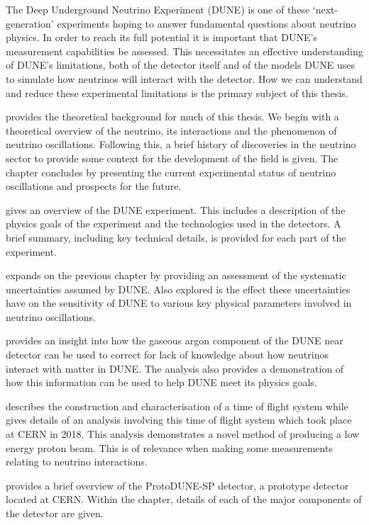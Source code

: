 The Deep Underground Neutrino Experiment (DUNE) is one of these `next-generation' experiments hoping to answer fundamental questions about neutrino physics.
In order to reach its full potential it is important that DUNE's measurement capabilities be assessed.
This necessitates an effective understanding of DUNE's limitations, both of the detector itself and of the models DUNE uses to simulate how neutrinos will interact with the detector.
How we can understand and reduce these experimental limitations is the primary subject of this thesis.

 provides the theoretical background for much of this thesis.
We begin with a theoretical overview of the neutrino, its interactions and the phenomenon of neutrino oscillations.
Following this, a brief history of discoveries in the neutrino sector to provide some context for the development of the field is given.
The chapter concludes by presenting the current experimental status of neutrino oscillations and prospects for the future.

 gives an overview of the DUNE experiment. 
This includes a description of the physics goals of the experiment and the technologies used in the detectors. 
A brief summary, including key technical details, is provided for each part of the experiment.

 expands on the previous chapter by providing an assessment of the systematic uncertainties assumed by DUNE.
Also explored is the effect these uncertainties have on the sensitivity of DUNE to various key physical parameters involved in neutrino oscillations.

 provides an insight into how the gaseous argon component of the DUNE near detector can be used to correct for lack of knowledge about how neutrinos interact with matter in DUNE.
The analysis also provides a demonstration of how this information can be used to help DUNE meet its physics goals.

 describes the construction and characterisation of a time of flight system while  gives details of an analysis involving this time of flight system which took place at CERN in 2018.
This analysis demonstrates a novel method of producing a low energy proton beam.
This is of relevance when making some measurements relating to neutrino interactions.

 provides a brief overview of the ProtoDUNE-SP detector, a prototype detector located at CERN.
Within the chapter, details of each of the major components of the detector are given.

